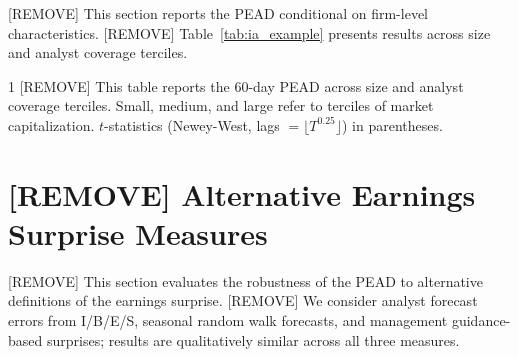 \documentclass[12pt]{article}
\begin{document}
[REMOVE] This section reports the PEAD conditional on firm-level characteristics. [REMOVE] Table~\ref{tab:ia_example} presents results across size and analyst coverage terciles.

\begin{table}[!ht]
\caption{[REMOVE] PEAD [+2, +60] by Size and Analyst Coverage Tercile (\%).}
\begin{spacing}{1}
{\footnotesize
[REMOVE] This table reports the 60-day PEAD across size and analyst coverage terciles. Small, medium, and large refer to terciles of market capitalization. $t$-statistics (Newey-West, lags $= \lfloor T^{0.25} \rfloor$) in parentheses.}
\end{spacing}
\vspace{-4mm}
\begin{center}
\label{tab:ia_example}
\vspace{2mm}
\end{center}
\end{table}

\section{[REMOVE] Alternative Earnings Surprise Measures}\label{sec:IA-robustness}

[REMOVE] This section evaluates the robustness of the PEAD to alternative definitions of the earnings surprise. [REMOVE] We consider analyst forecast errors from I/B/E/S, seasonal random walk forecasts, and management guidance-based surprises; results are qualitatively similar across all three measures.

\end{document}
